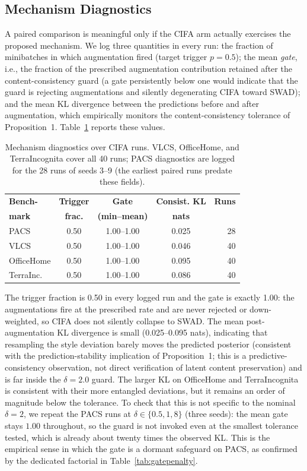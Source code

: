 \documentclass[electronics,article,submit,moreauthors]{Definitions/mdpi}
\begin{document}
\subsection{Mechanism Diagnostics}
\label{sec:mechdiag}

A paired comparison is meaningful only if the CIFA arm actually exercises the proposed mechanism. We log three quantities in every run: the fraction of minibatches in which augmentation fired (target trigger $p=0.5$); the mean \emph{gate}, i.e., the fraction of the prescribed augmentation contribution retained after the content-consistency guard (a gate persistently below one would indicate that the guard is rejecting augmentations and silently degenerating CIFA toward SWAD); and the mean KL divergence between the predictions before and after augmentation, which empirically monitors the content-consistency tolerance of Proposition~1. Table~\ref{tab:diag} reports these values.
\begin{table}[t]
\centering
\caption{Mechanism diagnostics over CIFA runs. VLCS, OfficeHome, and TerraIncognita cover all 40 runs; PACS diagnostics are logged for the 28 runs of seeds 3--9 (the earliest paired runs predate these fields).}
\label{tab:diag}
\setlength{\tabcolsep}{4pt}
\footnotesize
\begin{tabular}{lcccr}
\toprule
\textbf{Bench-} & \textbf{Trigger} & \textbf{Gate} & \textbf{Consist. KL} & \textbf{Runs}\\
\textbf{mark} & \textbf{frac.} & \textbf{(min--mean)} & \textbf{nats} & \\
\midrule
PACS & 0.50 & 1.00--1.00 & 0.025 & 28\\
VLCS & 0.50 & 1.00--1.00 & 0.046 & 40\\
OfficeHome & 0.50 & 1.00--1.00 & 0.095 & 40\\
TerraInc. & 0.50 & 1.00--1.00 & 0.086 & 40\\
\bottomrule
\end{tabular}
\end{table}

The trigger fraction is 0.50 in every logged run and the gate is exactly 1.00: the augmentations fire at the prescribed rate and are never rejected or down-weighted, so CIFA does not silently collapse to SWAD. The mean post-augmentation KL divergence is small (0.025--0.095 nats), indicating that resampling the style deviation barely moves the predicted posterior (consistent with the prediction-stability implication of Proposition~1; this is a predictive-consistency observation, not direct verification of latent content preservation) and is far inside the $\delta=2.0$ guard. The larger KL on OfficeHome and TerraIncognita is consistent with their more entangled deviations, but it remains an order of magnitude below the tolerance. To check that this is not specific to the nominal $\delta=2$, we repeat the PACS runs at $\delta\in\{0.5,1,8\}$ (three seeds): the mean gate stays $1.00$ throughout, so the guard is not invoked even at the smallest tolerance tested, which is already about twenty times the observed KL. This is the empirical sense in which the gate is a dormant safeguard on PACS, as confirmed by the dedicated factorial in Table~\ref{tab:gatepenalty}.
\end{document}
